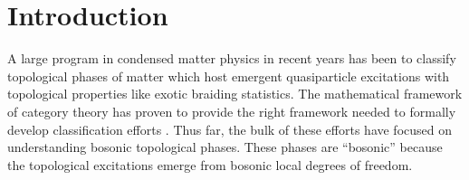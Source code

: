 
\section{Introduction}


A large program in condensed matter physics in recent years has been to classify 
topological phases of matter which host emergent quasiparticle excitations 
with topological properties like exotic braiding statistics. 
The mathematical framework of category theory has proven to provide the right 
framework needed to formally develop classification efforts \cite{kitaev2006}. 
Thus far, the bulk of these efforts have focused on understanding bosonic topological phases.
These phases are ``bosonic'' because the topological excitations emerge from bosonic 
local degrees of freedom.


